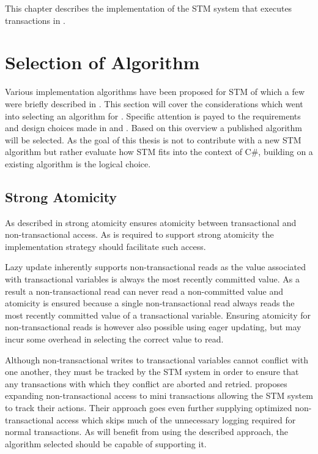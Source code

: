 \makeatletter {}\makeatother
{}
This chapter describes the implementation of the \ac{STM} system that executes transactions in \stmname. 
\label{chap:implementation}
\section{Selection of Algorithm}
Various implementation algorithms have been proposed for \ac{STM} of which a few were briefly described in . This section will cover the considerations which went into selecting an algorithm for \stmname. Specific attention is payed to the requirements and design choices made in  and . Based on this overview a published algorithm will be selected. As the goal of this thesis is not to contribute with a new \ac{STM} algorithm but rather evaluate how \ac{STM} fits into the context of C\#, building on a existing algorithm is the logical choice.

\subsection{Strong Atomicity}
As described in  strong atomicity ensures atomicity between transactional and non-transactional access. As \stmnamesp is required to support strong atomicity the implementation strategy should facilitate such access.

Lazy update inherently supports non-transactional reads as the value associated with transactional variables is always the most recently committed value\cite[p. 2084]{herlihy2011tm}\cite[p. 21]{harris2010transactional}. As a result a non-transactional read can never read a non-committed value and atomicity is ensured because a single non-transactional read always reads the most recently committed value of a transactional variable. Ensuring atomicity for non-transactional reads is however also possible using eager updating, but may incur some overhead in selecting the correct value to read. 

Although non-transactional writes to transactional variables cannot conflict with one another, they must be tracked by the \ac{STM} system in order to ensure that any transactions with which they conflict are aborted and retried. \cite{hindman2006atomicity} proposes expanding non-transactional access to mini transactions allowing the \ac{STM} system to track their actions. Their approach goes even further supplying optimized non-transactional access which skips much of the unnecessary logging required for normal transactions. As \stmnamesp will benefit from using the described approach, the algorithm selected should be capable of supporting it.
 
